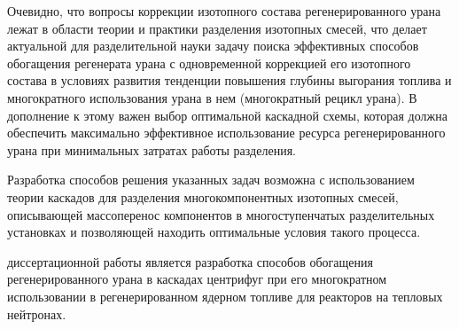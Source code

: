 Очевидно, что вопросы коррекции изотопного состава регенерированного урана лежат в области теории и практики разделения изотопных смесей, что делает актуальной для разделительной науки задачу поиска эффективных способов обогащения регенерата урана с одновременной коррекцией его изотопного состава в условиях развития тенденции повышения глубины выгорания топлива и многократного использования урана в нем (многократный рецикл урана). В дополнение к этому важен выбор оптимальной каскадной схемы, которая должна обеспечить максимально эффективное использование ресурса регенерированного урана при минимальных затратах работы разделения.

Разработка способов решения указанных задач возможна с использованием теории каскадов для разделения многокомпонентных изотопных смесей, описывающей массоперенос компонентов в многоступенчатых разделительных установках и позволяющей находить оптимальные условия такого процесса.


{\aim} диссертационной работы является разработка способов обогащения регенерированного урана в каскадах центрифуг при его многократном использовании в регенерированном ядерном топливе для реакторов на тепловых нейтронах.

